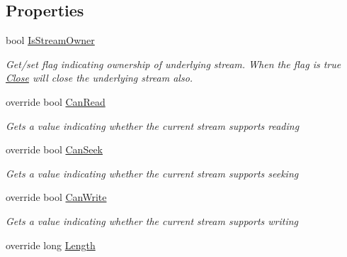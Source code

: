 \subsection*{Properties}
\begin{DoxyCompactItemize}
\item 
bool \hyperlink{class_i_c_sharp_code_1_1_sharp_zip_lib_1_1_b_zip2_1_1_b_zip2_output_stream_af8eeae328590a785cc2bd081fe79dd74}{Is\+Stream\+Owner}
\begin{DoxyCompactList}\small\item\em Get/set flag indicating ownership of underlying stream. When the flag is true \hyperlink{class_i_c_sharp_code_1_1_sharp_zip_lib_1_1_b_zip2_1_1_b_zip2_output_stream_a6d8efc71b181f35fc1529213a8252837}{Close} will close the underlying stream also. \end{DoxyCompactList}\item 
override bool \hyperlink{class_i_c_sharp_code_1_1_sharp_zip_lib_1_1_b_zip2_1_1_b_zip2_output_stream_a542cd1e69aef8e57a3fd7ae13fe09678}{Can\+Read}
\begin{DoxyCompactList}\small\item\em Gets a value indicating whether the current stream supports reading \end{DoxyCompactList}\item 
override bool \hyperlink{class_i_c_sharp_code_1_1_sharp_zip_lib_1_1_b_zip2_1_1_b_zip2_output_stream_a6b0c9293c664c242fc848ae074c0e7cf}{Can\+Seek}
\begin{DoxyCompactList}\small\item\em Gets a value indicating whether the current stream supports seeking \end{DoxyCompactList}\item 
override bool \hyperlink{class_i_c_sharp_code_1_1_sharp_zip_lib_1_1_b_zip2_1_1_b_zip2_output_stream_aaaf77abe0ecd22c5fc12454007375ab2}{Can\+Write}
\begin{DoxyCompactList}\small\item\em Gets a value indicating whether the current stream supports writing \end{DoxyCompactList}\item 
override long \hyperlink{class_i_c_sharp_code_1_1_sharp_zip_lib_1_1_b_zip2_1_1_b_zip2_output_stream_a08becc17e8e83e0a0f8fe87c98f4bdc2}{Length}

\end{DoxyCompactItemize}
